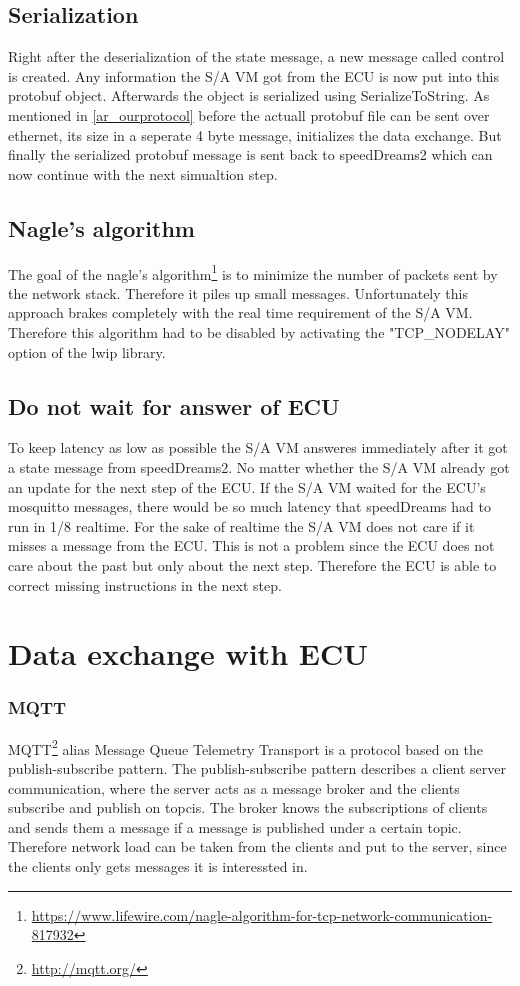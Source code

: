 \documentclass[paper=a4, fontsize=11pt]{scrreprt}
\begin{document}
  \subsection{Serialization}
Right after the deserialization of the state message, a new message called control is created. Any information the S/A VM got from the ECU is now put into this protobuf object. Afterwards the object is serialized using SerializeToString. As mentioned in \ref{ar_ourprotocol} before the actuall protobuf file can be sent over ethernet, its size in a seperate 4 byte message, initializes the data exchange. But finally the serialized protobuf message is sent back to speedDreams2 which can now continue with the next simualtion step.
  \subsection{Nagle's algorithm}
The goal of the nagle's algorithm\footnote{\url{https://www.lifewire.com/nagle-algorithm-for-tcp-network-communication-817932}} is to minimize the number of packets sent by the network stack. Therefore it piles up small messages. Unfortunately this approach brakes completely with the real time requirement of the S/A VM. Therefore this algorithm had to be disabled by activating the "TCP\_NODELAY" option of the lwip library.
  \subsection{Do not wait for answer of ECU}
To keep latency as low as possible the S/A VM answeres immediately after it got a state message from speedDreams2. No matter whether the S/A VM already got an update for the next step of the ECU. If the S/A VM waited for the ECU's mosquitto messages, there would be so much latency that speedDreams had to run in 1/8 realtime. For the sake of realtime the S/A VM does not care if it misses a message from the ECU. This is not a problem since the ECU does not care about the past but only about the next step. Therefore the ECU is able to correct missing instructions in the next step.

\section{Data exchange with ECU}
  \subsubsection{MQTT}
MQTT\footnote{\url{http://mqtt.org/}} alias Message Queue Telemetry Transport is a protocol based on the publish-subscribe pattern.\newline
The publish-subscribe pattern describes a client server communication, where the server acts as a message broker and the clients subscribe and publish on topcis. The broker knows the subscriptions of clients and sends them a message if a message is published under a certain topic. Therefore network load can be taken from the clients and put to the server, since the clients only gets messages it is interessted in.
\end{document}
